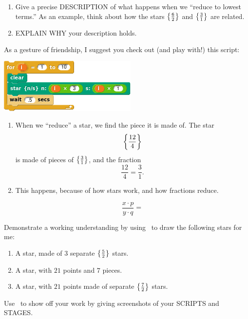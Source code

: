 \documentclass[noauthor,nooutcomes,12pt,hints,handout]{ximera}
\begin{document}
\begin{question}
  \begin{enumerate}
  \item Give a precise DESCRIPTION of what happens when we ``reduce to
    lowest terms.'' As an example, think about how the stars
    $\left\{\frac{6}{2}\right\}$ and $\left\{\frac{3}{1}\right\}$ are related.
  \item EXPLAIN WHY your description holds.
  \end{enumerate}
  As a gesture of friendship, I suggest you check out (and play with!)
  this script:
  \begin{center}
    \includegraphics{starSeq.png}
  \end{center}
  \begin{freeResponse}
    \begin{enumerate}
      \item When we ``reduce'' a star, we find the piece it is made
        of.  The star
        \[
        \left\{\frac{12}{4}\right\}
        \]
        is made of pieces of $\left\{\frac{3}{1}\right\}$, and the fraction
        \[
        \frac{12}{4} = \frac{3}{1}.
        \]
      \item This happens, because of how stars work, and how fractions reduce.

\[
        \frac{x\cdot p}{y\cdot q} =  
\]
        
    \end{enumerate}
  \end{freeResponse}
\end{question}

\mynewpage


\begin{question}
  Demonstrate a working understanding by using \snap\ to draw the
  following stars for me:
  \begin{enumerate}
  \item A star, made of $3$ separate $\left\{\frac{5}{2}\right\}$ stars.
   \item A star, with $21$ points and $7$ pieces. 
   \item A star, with $21$ points made of separate $\left\{\frac{7}{2}\right\}$
     stars.
  \end{enumerate}
  Use \snap\ to show off your work by giving screenshots of your
  SCRIPTS and STAGES.
  \begin{freeResponse}
    \begin{enumerate}
    \end{enumerate}
  \end{freeResponse}
\end{question}
\end{document}

